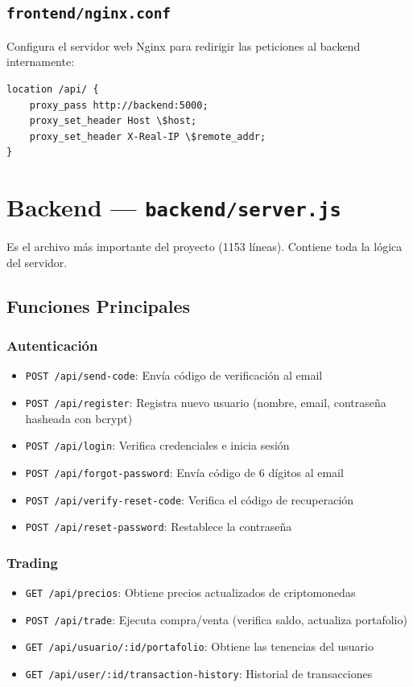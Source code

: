 \documentclass[12pt,oneside]{article}
\begin{document}
\subsection{\texttt{frontend/nginx.conf}}

Configura el servidor web Nginx para redirigir las peticiones al backend internamente:

\begin{lstlisting}
location /api/ {
    proxy_pass http://backend:5000;
    proxy_set_header Host \$host;
    proxy_set_header X-Real-IP \$remote_addr;
}
\end{lstlisting}

\section{Backend — \texttt{backend/server.js}}

Es el archivo más importante del proyecto (1153 líneas). Contiene toda la lógica del servidor.

\subsection{Funciones Principales}

\subsubsection{Autenticación}
\begin{itemize}
    \item \texttt{POST /api/send-code}: Envía código de verificación al email
    \item \texttt{POST /api/register}: Registra nuevo usuario (nombre, email, contraseña hasheada con bcrypt)
    \item \texttt{POST /api/login}: Verifica credenciales e inicia sesión
    \item \texttt{POST /api/forgot-password}: Envía código de 6 dígitos al email
    \item \texttt{POST /api/verify-reset-code}: Verifica el código de recuperación
    \item \texttt{POST /api/reset-password}: Restablece la contraseña
\end{itemize}

\subsubsection{Trading}
\begin{itemize}
    \item \texttt{GET /api/precios}: Obtiene precios actualizados de criptomonedas
    \item \texttt{POST /api/trade}: Ejecuta compra/venta (verifica saldo, actualiza portafolio)
    \item \texttt{GET /api/usuario/:id/portafolio}: Obtiene las tenencias del usuario
    \item \texttt{GET /api/user/:id/transaction-history}: Historial de transacciones
\end{itemize}
\end{document}
